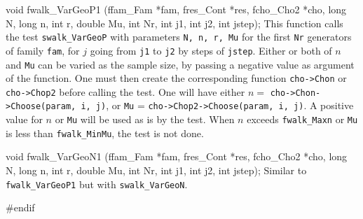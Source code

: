 void fwalk_VarGeoP1 (ffam_Fam *fam, fres_Cont *res, fcho_Cho2 *cho,
                     long N, long n, int r, double Mu,
                     int Nr, int j1, int j2, int jstep);
\endcode
\tab
  This function calls the test {\tt swalk\_VarGeoP} with
  parameters {\tt N, n, r, Mu} for the first {\tt Nr} generators of
  family {\tt fam}, for $j$ going from {\tt j1} to {\tt j2} by steps of
  {\tt jstep}. Either or both of $n$ and {\tt Mu} can be varied as
  the sample size, by passing a negative value as argument of the
  function. One must then create the corresponding function
  {\tt cho->Chon} or {\tt cho->Chop2} before calling the test.
  One will have either $n = {}$ {\tt cho->Chon->Choose(param, i, j)},
  or  {\tt Mu} = {\tt cho->Chop2->Choose(param, i, j)}. A positive value
  for $n$ or {\tt Mu} will be used as is by the test. When $n$ exceeds
  {\tt fwalk\_Maxn} or {\tt Mu} is less than {\tt fwalk\_MinMu},
  the test is not done.
\endtab
\code


void fwalk_VarGeoN1 (ffam_Fam *fam, fres_Cont *res, fcho_Cho2 *cho,
                     long N, long n, int r, double Mu,
                     int Nr, int j1, int j2, int jstep);
\endcode
\tab Similar to {\tt fwalk\_VarGeoP1} but with {\tt swalk\_VarGeoN}.
\endtab

\code
\hide 
#endif
\endhide
\endcode
